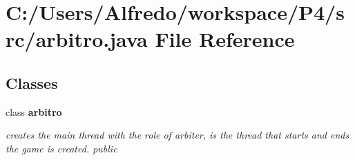 \section{C\+:/\+Users/\+Alfredo/workspace/\+P4/src/arbitro.java File Reference}
\label{arbitro_8java}
\subsection*{Classes}
\begin{DoxyCompactItemize}
\item 
class {\bf arbitro}
\begin{DoxyCompactList}\small\item\em creates the main thread with the role of arbiter, is the thread that starts and ends the game is created.  public \end{DoxyCompactList}\end{DoxyCompactItemize}
